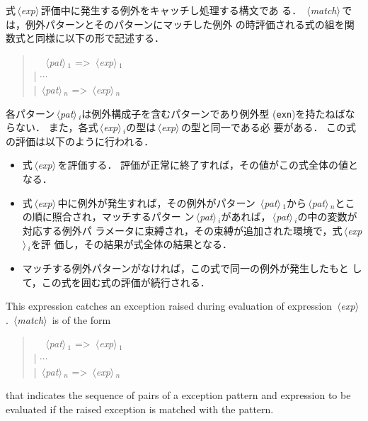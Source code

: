 \documentclass{jbook}
\newcommand{\code}[1]{\mbox{\large\tt #1}}
\newcommand{\nonterm}[1]{\mbox{$\,\langle$}{\it #1}\mbox{$\rangle\,$}}
\newcommand{\myem}{\mbox{\ \ }}
\newenvironment{program}{\begin{quote}\begin{tt}}%
                        {\end{tt}\end{quote}}
\begin{document}
\ifjp%
	式\nonterm{exp}評価中に発生する例外をキャッチし処理する構文であ
る．
	\nonterm{match}では，例外パターンとそのパターンにマッチした例外
の時評価される式の組を関数式と同様に以下の形で記述する．
\begin{program}
\myem  \nonterm{pat}$_1$ => \nonterm{exp}$_1$
\\
| $\cdots$
\\
| \nonterm{pat}$_n$ => \nonterm{exp}$_n$
\end{program}
	各パターン\nonterm{pat}$_i$は例外構成子を含むパターンであり例外型
(\code{exn})を持たねばならない．
	また，各式\nonterm{exp}$_i$の型は\nonterm{exp}の型と同一である必
要がある．
	この式の評価は以下のように行われる．
\begin{itemize}
\item 式\nonterm{exp}を評価する．
	評価が正常に終了すれば，その値がこの式全体の値となる．
\item 式\nonterm{exp}中に例外が発生すれば，その例外がパターン
\nonterm{pat}$_1$から\nonterm{pat}$_n$とこの順に照合され，マッチするパター
ン\nonterm{pat}$_i$があれば，\nonterm{pat}$_i$の中の変数が対応する例外パ
ラメータに束縛され，その束縛が追加された環境で，式\nonterm{exp}$_i$を評
価し，その結果が式全体の結果となる．
\item マッチする例外パターンがなければ，この式で同一の例外が発生したもと
して，この式を囲む式の評価が続行される．
\end{itemize}	
\else%
	This expression catches an exception raised during evaluation
of expression \nonterm{exp}.
	\nonterm{match} is of the form
\begin{program}
\myem  \nonterm{pat}$_1$ => \nonterm{exp}$_1$
\\
| $\cdots$
\\
| \nonterm{pat}$_n$ => \nonterm{exp}$_n$
\end{program}
that indicates the sequence of pairs of a exception
pattern and expression to be evaluated if the raised exception is
matched with the pattern.
\end{document}

